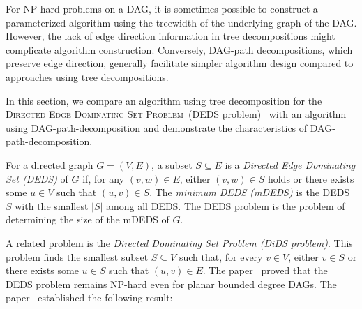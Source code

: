 \documentclass[runningheads]{llncs}
\theoremstyle{plain}
\theoremstyle{definition}
\begin{document}

For NP-hard problems on a DAG, it is sometimes possible to construct a parameterized algorithm using the treewidth of the underlying graph of the DAG.  
However, the lack of edge direction information in tree decompositions might complicate algorithm construction. Conversely, DAG-path decompositions, which preserve edge direction, generally facilitate simpler algorithm design compared to approaches using tree decompositions.

In this section, we compare an algorithm using tree decomposition for the \textsc{Directed Edge Dominating Set Problem}~(DEDS problem)~\cite{art22} with an algorithm using DAG-path-decomposition and demonstrate the characteristics of DAG-path-decomposition.  

For a directed graph \(G = (V, E)\), a subset \(S \subseteq E\) is a \emph{Directed Edge Dominating Set (DEDS)} of \(G\) if, for any \((v, w) \in E\), either \((v, w) \in S\) holds or there exists some \(u \in V\) such that \((u, v) \in S\).  
The \emph{minimum DEDS (mDEDS)} is the DEDS \(S\) with the smallest \(|S|\) among all DEDS.  
The DEDS problem is the problem of determining the size of the mDEDS of \(G\).  

A related problem is the \emph{Directed Dominating Set Problem (DiDS problem)}.  
This problem finds the smallest subset \(S \subseteq V\) such that, for every \(v \in V\), either \(v \in S\) or there exists some \(u \in S\) such that \((u, v) \in E\). The paper~\cite{art23} proved that the DEDS problem remains NP-hard even for planar bounded degree DAGs. The paper~\cite{art22} established the following result:
\end{document}
